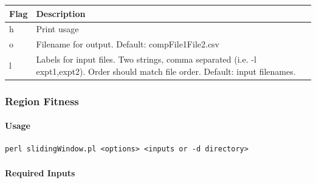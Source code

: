 \documentclass[11pt,]{article}
\let\oldparagraph\paragraph
\renewcommand{\paragraph}[1]{\oldparagraph{#1}\mbox{}}
\begin{document}
\begin{longtable}[]{@{}ll@{}}
\toprule
\begin{minipage}[b]{0.06\columnwidth}\raggedright\strut
Flag\strut
\end{minipage} & \begin{minipage}[b]{0.88\columnwidth}\raggedright\strut
Description\strut
\end{minipage}\tabularnewline
\midrule
\endhead
\begin{minipage}[t]{0.06\columnwidth}\raggedright\strut
h\strut
\end{minipage} & \begin{minipage}[t]{0.88\columnwidth}\raggedright\strut
Print usage\strut
\end{minipage}\tabularnewline
\begin{minipage}[t]{0.06\columnwidth}\raggedright\strut
o\strut
\end{minipage} & \begin{minipage}[t]{0.88\columnwidth}\raggedright\strut
Filename for output. Default: compFile1File2.csv\strut
\end{minipage}\tabularnewline
\begin{minipage}[t]{0.06\columnwidth}\raggedright\strut
l\strut
\end{minipage} & \begin{minipage}[t]{0.88\columnwidth}\raggedright\strut
Labels for input files. Two strings, comma separated (i.e. -l
expt1,expt2). Order should match file order. Default: input
filenames.\strut
\end{minipage}\tabularnewline
\bottomrule
\end{longtable}

\subsubsection{Region Fitness}\label{region-fitness}

\paragraph{Usage}\label{usage-5}

\begin{verbatim}
perl slidingWindow.pl <options> <inputs or -d directory>
\end{verbatim}

\paragraph{Required Inputs}\label{required-inputs-5}
\end{document}
